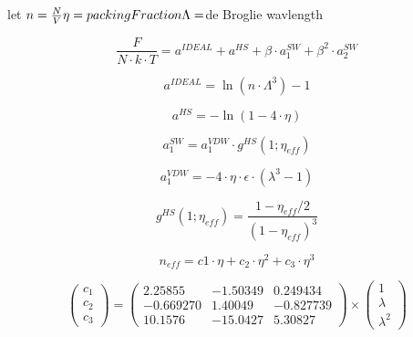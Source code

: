 \begin{multicols}{2}
let $n=\frac{N}{V}\newline\eta=packingFraction\newline\Lambda=$de Broglie wavlength

\begin{equation}\label{eq:saftF18}
\frac{F}{N\cdot k\cdot T}=a^{IDEAL}+a^{HS}+\beta\cdot a_1^{SW}+\beta^2\cdot a_2^{SW}
\end{equation}

\begin{equation}\label{eq:saftF1a}
a^{IDEAL}=\ln\left(n\cdot \Lambda^3\right)-1
\end{equation}

\begin{equation}\label{eq:saftF1b}
a^{HS}=-\ln(1-4\cdot \eta)
\end{equation}

\begin{equation}\label{eq:saftF34}
a_1^{SW}=a_1^{VDW}\cdot g^{HS}(1;\eta_{eff})
\end{equation}

\begin{equation}\label{eq:saftF35}
a_1^{VDW}=-4\cdot \eta\cdot \epsilon\cdot (\lambda^3-1)
\end{equation}

\begin{equation}\label{eq:saftF33}
g^{HS}(1;\eta_{eff})=\frac{1-\eta_{eff}/2}{(1-\eta_{eff})^3}
\end{equation}

\begin{equation}\label{eq:saftF36}
n_{eff}=c1\cdot \eta+c_2\cdot \eta^2+c_3\cdot \eta^3
\end{equation}

\begin{equation}\label{eq:saftF37}
\scriptscriptstyle
\begin{pmatrix}c_1\\c_2\\c_3\end{pmatrix}=
\begin{pmatrix}
2.25855 & -1.50349 & 0.249434 \\
-0.669270 & 1.40049 & -0.827739 \\
10.1576 & -15.0427 & 5.30827
\end{pmatrix}\times
\begin{pmatrix}
1\\ \lambda \\ \lambda^2
\end{pmatrix}
\end{equation}


\end{multicols}
